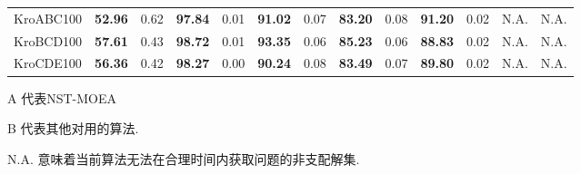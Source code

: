 \begin{table}[h]
\begin{threeparttable}
\begin{tabular}{lcccccccccccc}
            KroABC100                     & \textbf{52.96}                & 0.62                           & \textbf{97.84}                 & 0.01                     & \textbf{91.02}              & 0.07                      & \textbf{83.20}           & 0.08   & \textbf{91.20}  & 0.02   & N.A.            & N.A.  \\
            KroBCD100                     & \textbf{57.61}                & 0.43                           & \textbf{98.72}                 & 0.01                     & \textbf{93.35}              & 0.06                      & \textbf{85.23}           & 0.06   & \textbf{88.83}  & 0.02   & N.A.            & N.A.  \\
            KroCDE100                     & \textbf{56.36}                & 0.42                           & \textbf{98.27}                 & 0.00                     & \textbf{90.24}              & 0.08                      & \textbf{83.49}           & 0.07   & \textbf{89.80}  & 0.02   & N.A.            & N.A.  \\
            \bottomrule
        \end{tabular}
        \begin{tablenotes}
            \item[] A 代表NST-MOEA
            \item[] B 代表其他对用的算法.
            \item[] N.A. 意味着当前算法无法在合理时间内获取问题的非支配解集.
        \end{tablenotes}
    \end{threeparttable}
\end{table}

